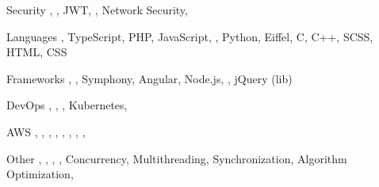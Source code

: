 

\begin{cvskills}

\cvskill
  {Security} %
  {, , JWT, , Network Security, } %

\cvskill
  {Languages} %
  {, TypeScript, PHP, JavaScript, , Python, Eiffel, C, C++, SCSS, HTML, CSS} %

\cvskill
  {Frameworks} %
  {, , Symphony, Angular, Node.js, , jQuery (lib)} %


\cvskill
  {DevOps} %
  {, , , Kubernetes, } %

\cvskill
  {AWS} %
  {, , , , , , , , } %


\cvskill
  {Other} %
  {, , , , Concurrency, Multithreading, Synchronization, Algorithm Optimization, } %

\end{cvskills}
